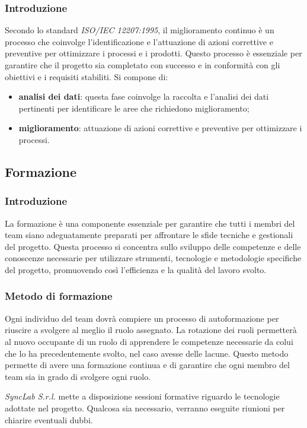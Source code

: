 \subsubsection{Introduzione}
Secondo lo standard \textit{ISO/IEC 12207:1995}, il miglioramento continuo è un processo che coinvolge l'identificazione e l'attuazione di azioni correttive e preventive per ottimizzare i processi e i prodotti. Questo processo è essenziale per garantire che il progetto sia completato con successo e in conformità con gli obiettivi e i requisiti stabiliti. Si compone di:
\begin{itemize}
    \item \textbf{analisi dei dati}: questa fase coinvolge la raccolta e l'analisi dei dati pertinenti per identificare le aree che richiedono miglioramento;
    \item \textbf{miglioramento}: attuazione di azioni correttive e preventive per ottimizzare i processi.
\end{itemize}

\subsection{Formazione}
\subsubsection{Introduzione}
La formazione è una componente essenziale per garantire che tutti i membri del team siano adeguatamente preparati per affrontare le sfide tecniche e gestionali del progetto. Questa processo si concentra sullo sviluppo delle competenze e delle conoscenze necessarie per utilizzare strumenti, tecnologie e metodologie specifiche del progetto, promuovendo così l'efficienza e la qualità del lavoro svolto.

\subsubsection{Metodo di formazione}
Ogni individuo del team dovrà compiere un processo di autoformazione per riuscire a svolgere al meglio il ruolo assegnato. La rotazione dei ruoli permetterà al nuovo occupante di un ruolo di apprendere le competenze necessarie da colui che lo ha precedentemente svolto, nel caso avesse delle lacune. Questo metodo permette di avere una formazione continua e di garantire che ogni membro del team sia in grado di svolgere ogni ruolo.

\textit{SyncLab S.r.l.} mette a disposizione sessioni formative riguardo le tecnologie adottate nel progetto.
Qualcosa sia necessario, verranno eseguite riunioni per chiarire eventuali dubbi.